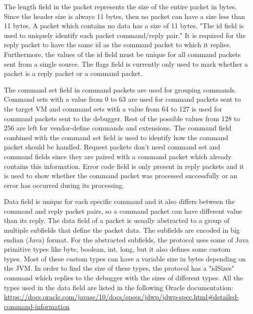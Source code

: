 \documentclass[..thesis.tex]{subfiles}
\begin{document}
The length field in the packet represents the size of the entire packet in bytes. 
Since the header size is always 11 bytes, then no packet can have a size less than 11 bytes.
A packet which contains no data has a size of 11 bytes.
"The id field is used to uniquely identify each packet command/reply pair."\cite{oracle_jdwp_spec}
It is required for the reply packet to have the same id as the command packet to which it replies.
Furthermore, the values of the id field must be unique for all command packets sent from a single source.
The flags field is currently only used to mark whether a packet is a reply packet or a command packet.

The command set field in command packets are used for grouping commands. 
Command sets with a value from 0 to 63 are used for command packets sent to the target VM and command sets with a value from 64 to 127 is used for command packets sent to the debugger. Rest of the possible values from 128 to 256 are left for vendor-define commands and extensions.\cite{oracle_jdwp_spec}
The command field combined with the command set field is used to identify how the command packet should be handled. 
Request packets don't need command set and command fields since they are paired with a command packet which already contains this information.
Error code field is only present in reply packets and it is used to show whether the command packet was processed successfully or an error has occurred during its processing.

Data field is unique for each specific command and it also differs between the command and reply packet pairs, so a command packet can have different value than its reply.
The data field of a packet is usually abstracted to a group of multiple subfields that define the packet data. The subfields are encoded in big endian (Java) format.
For the abstracted subfields, the protocol uses some of Java primitive types like byte, boolean, int, long, but it also defines some custom types.
Most of these custom types can have a variable size in bytes depending on the JVM.
In order to find the size of these types, the protocol has a "idSizes" command which replies to the debugger with the sizes of different types.\cite{oracle_jdwp_spec}
All the types used in the data field are listed in the following Oracle documentation: \url{https://docs.oracle.com/javase/10/docs/specs/jdwp/jdwp-spec.html\#detailed-command-information}
\end{document}
